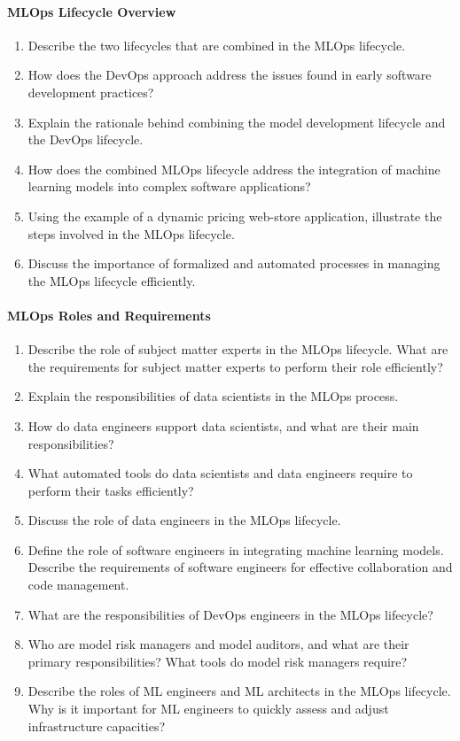 \paragraph*{MLOps Lifecycle Overview}
\begin{enumerate}
    \item Describe the two lifecycles that are combined in the MLOps lifecycle.
    \item How does the DevOps approach address the issues found in early software development practices?
    \item Explain the rationale behind combining the model development lifecycle and the DevOps lifecycle.
    \item How does the combined MLOps lifecycle address the integration of machine learning models into complex software applications?
    \item Using the example of a dynamic pricing web-store application, illustrate the steps involved in the MLOps lifecycle.
    \item Discuss the importance of formalized and automated processes in managing the MLOps lifecycle efficiently.
\end{enumerate}
\paragraph*{MLOps Roles and Requirements}
\begin{enumerate}
    \item Describe the role of subject matter experts in the MLOps lifecycle. What are the requirements for subject matter experts to perform their role efficiently?
    \item Explain the responsibilities of data scientists in the MLOps process.
    \item How do data engineers support data scientists, and what are their main responsibilities?
    \item What automated tools do data scientists and data engineers require to perform their tasks efficiently?
    \item Discuss the role of data engineers in the MLOps lifecycle.
    \item Define the role of software engineers in integrating machine learning models. Describe the requirements of software engineers for effective collaboration and code management.
    \item What are the responsibilities of DevOps engineers in the MLOps lifecycle?
    \item Who are model risk managers and model auditors, and what are their primary responsibilities? What tools do model risk managers require?
    \item Describe the roles of ML engineers and ML architects in the MLOps lifecycle. Why is it important for ML engineers to quickly assess and adjust infrastructure capacities?
\end{enumerate}
